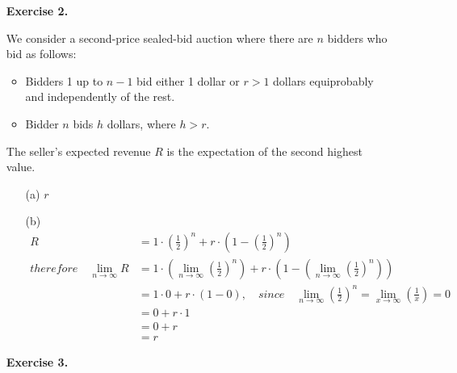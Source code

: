 \documentclass{article}
\begin{document}
\begin{enumerate}
\begin{enumerate}
		\hfill{\bf [3 marks]}\smallskip
		\item[(c)] Discuss what this ratio is for arbitrary $m$. What does this imply about the Price of Anarchy on identical machines for mixed Nash equilibria?
		For arbitrary $m$, this ratio is equal to the social cost of the mixed strategy profile $A$ ($cost(A)$) since the optimal social cost ($cost(OPT)$) is always $1$ for any $m$. 
		?????
		This implies that the Price of Anarchy on identical machines for mixed Nash equilibria depends only on the social cost of the increases as the number of machines increases. 
		\hfill{\bf [5 marks]}\smallskip
	\end{enumerate}
	\vspace*{0.8cm}
	

	\item[\textbf{Exercise 2.}]  %

	We consider a second-price sealed-bid auction where there are $n$ bidders who bid as follows:
	\begin{itemize}
		\item Bidders 1 up to $n-1$ bid either 1 dollar or $r > 1$ dollars equiprobably and
		independently of the rest.
		\item Bidder $n$ bids $h$ dollars, where $h > r$.
	\end{itemize}
	The seller's expected revenue $R$ is the expectation of the second highest value. 
	\begin{itemize}
		\item[(a)] $r$
		\item[(b)]
		\begin{equation*}
			\begin{split}
				R 
				& = 1 \cdot (\frac{1}{2})^n + r \cdot (1-(\frac{1}{2})^n) \\
				therefore \quad \lim_{n \to \infty} R
				& = 1 \cdot (\lim_{n \to \infty}(\frac{1}{2})^n) + r \cdot (1-(\lim_{n \to \infty}(\frac{1}{2})^n)) \\
				& = 1 \cdot 0 + r \cdot (1-0), \quad since \quad \lim_{n \to \infty}(\frac{1}{2})^n = \lim_{x \to \infty}(\frac{1}{x}) = 0 \\
				& = 0 + r \cdot 1 \\
				& = 0 + r \\
				& = r 
			\end{split}
		\end{equation*}
	\end{itemize}



	\item[\textbf{Exercise 3.}]   %


\end{enumerate}
\end{document}
